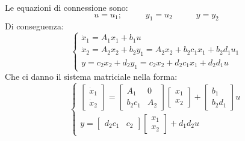Le equazioni di connessione sono:
\[
    u = u_1; \;\;\;\;\;\;\;\;\;\;y_1 = u_2 \;\;\;\;\;\;\;\;\;\;y=y_2
\]
Di conseguenza:
\[
    \begin{cases}
        \dot{x}_1 = A_1 x_1 + b_1 u\\
        \dot{x}_2 = A_2 x_2 + b_2 y_1 = A_2 x_2 + b_2 c_1x_1 + b_2 d_1 u_1\\
        y = c_2 x_2 + d_2 y_1 = c_2 x_2 + d_2 c_1 x_1 + d_2 d_1 u
    \end{cases}
\]
Che ci danno il sistema matriciale nella forma:
\[
    \begin{cases}
        \left[\begin{matrix}
            \dot{x}_1\\\dot{x}_2
        \end{matrix}\right] = \left[\begin{matrix}
            A_1 & 0 \\ b_2 c_1 & A_2
        \end{matrix}\right] \left[\begin{matrix}
            x_1\\x_2
        \end{matrix}\right] + \left[\begin{matrix}
            b_1 \\b_2 d_1
        \end{matrix}\right] u\\
        y = \left[\begin{matrix}
            d_2c_1 & c_2
        \end{matrix}\right] \left[\begin{matrix}
            x_1\\x_2
        \end{matrix}\right] + d_1d_2 u
    \end{cases}
\]
